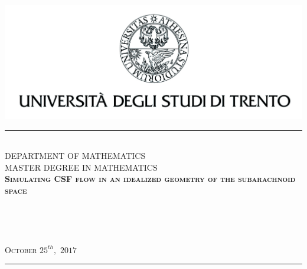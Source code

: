 \documentclass[a4paper,11pt,openright,twoside]{book}
\begin{document}

\begin{titlepage}
\begin{center}
\vspace*{-2.7cm}
\includegraphics{images/aquila_nome}
\\
\rule{\textwidth}{1pt}
\\[0.5cm]
{\Large DEPARTMENT OF MATHEMATICS}
\\[0.35cm]
{\Large MASTER DEGREE IN MATHEMATICS}
\\[3.5cm]
\textsc{\huge \textbf{Simulating CSF flow in an idealized geometry of the subarachnoid space}}
\\[4cm]
\begin{minipage}{0.5\textwidth}
\\
\end{minipage}
\begin{minipage}{0.45\textwidth}
\vspace{-3.2cm}
 \\
\end{minipage}

\vspace*{\fill}
{\textsc{\normalsize October $25^{th},$ $2017$}}
\rule{\textwidth}{1pt}


\end{center}
\newpage
\thispagestyle{empty}
\phantom{}
\end{titlepage}
\newpage
\thispagestyle{empty}
\end{document}
